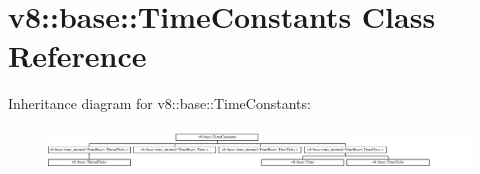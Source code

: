 \hypertarget{classv8_1_1base_1_1TimeConstants}{}\section{v8\+:\+:base\+:\+:Time\+Constants Class Reference}
\label{classv8_1_1base_1_1TimeConstants}
Inheritance diagram for v8\+:\+:base\+:\+:Time\+Constants\+:\begin{figure}[H]
\begin{center}
\leavevmode
\includegraphics[height=1.131313cm]{classv8_1_1base_1_1TimeConstants}
\end{center}
\end{figure}
